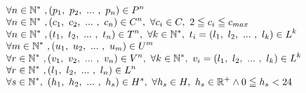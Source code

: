 \documentclass[french]{article}
\begin{document}
\vspace*{0.3cm}
\noindent
$\displaystyle  \begin{array}{{>{\displaystyle}l}}
\forall n\in \mathbb{N}^{*\ } ,( p_{1} ,\ p_{2} ,\ ...\ ,\ p_{n}) \in P^{n}\\
\forall n\in \mathbb{N}^{*\ } ,( c_{1} ,\ c_{2} ,\ ...\ ,\ c_{n}) \in C^{n} ,\ \forall c_{i} \in C,\ 2\leqq c_{i} \leqq c_{max}\\
\forall n\in \mathbb{N}^{*\ } ,( t_{1} ,\ t_{2} ,\ ...\ ,\ t_{n}) \in T^{n} ,\ \forall k\in \mathbb{N}^{*} ,\ t_{i} =( l_{1} ,\ l_{2} ,\ ...\ ,\ l_{k}) \in L^{k}\\
\forall m\in \mathbb{N}^{*\ } ,( u_{1} ,\ u_{2} ,\ ...\ ,\ u_{m}) \in U^{m}\\
\forall r\in \mathbb{N}^{*\ } ,( v_{1} ,\ v_{2} ,\ ...\ ,\ v_{n}) \in V^{n} ,\ \forall k\in \mathbb{N}^{*} ,\ v_{i} =( l_{1} ,\ l_{2} ,\ ...\ ,\ l_{k}) \in L^{k}\\
\forall r\in \mathbb{N}^{*\ } ,( l_{1} ,\ l_{2} ,\ ...\ ,\ l_{n}) \in L^{n}\\
\forall s\in \mathbb{N}^{*} ,\ ( h_{1} ,\ h_{2} ,\ ...\ ,\ h_{s}) \in H^{s} ,\ \forall h_{s} \in H,\ h_{s} \in \mathbb{R}^{+} \land 0\leqq h_{s} < 24
\end{array}$
\end{document}
